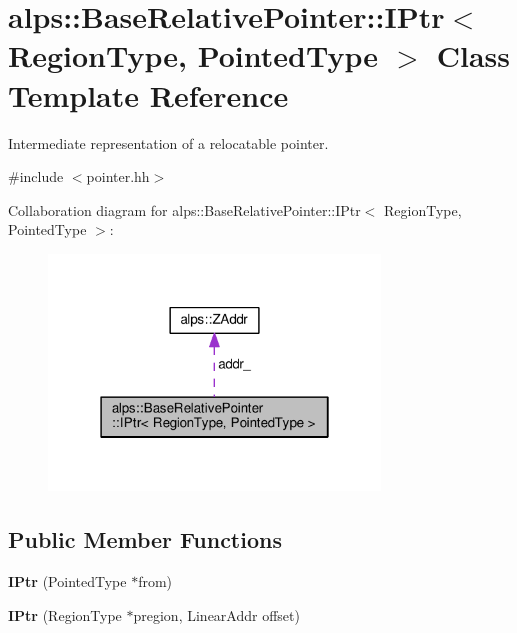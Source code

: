 \hypertarget{classalps_1_1BaseRelativePointer_1_1IPtr}{}\section{alps\+:\+:Base\+Relative\+Pointer\+:\+:I\+Ptr$<$ Region\+Type, Pointed\+Type $>$ Class Template Reference}
\label{classalps_1_1BaseRelativePointer_1_1IPtr}


Intermediate representation of a relocatable pointer.  




{\ttfamily \#include $<$pointer.\+hh$>$}



Collaboration diagram for alps\+:\+:Base\+Relative\+Pointer\+:\+:I\+Ptr$<$ Region\+Type, Pointed\+Type $>$\+:
\nopagebreak
\begin{figure}[H]
\begin{center}
\leavevmode
\includegraphics[width=250pt]{classalps_1_1BaseRelativePointer_1_1IPtr__coll__graph}
\end{center}
\end{figure}
\subsection*{Public Member Functions}
\begin{DoxyCompactItemize}
\item 
{\bfseries I\+Ptr} (Pointed\+Type $\ast$from)\hypertarget{classalps_1_1BaseRelativePointer_1_1IPtr_af35c8eb7b06b7b67dca454b36dd3cfe7}{}\label{classalps_1_1BaseRelativePointer_1_1IPtr_af35c8eb7b06b7b67dca454b36dd3cfe7}

\item 
{\bfseries I\+Ptr} (Region\+Type $\ast$pregion, Linear\+Addr offset)\hypertarget{classalps_1_1BaseRelativePointer_1_1IPtr_a9dae302ad3f661f80368a50609d32e2f}{}\label{classalps_1_1BaseRelativePointer_1_1IPtr_a9dae302ad3f661f80368a50609d32e2f}

\end{DoxyCompactItemize}
